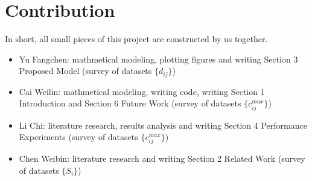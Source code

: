 \section{Contribution}

In short, all small pieces of this project are constructed by us together.
\begin{itemize}
    \item Yu Fangchen: mathmetical modeling, plotting figures and writing Section 3 Proposed Model (survey of datasets $\{d_{ij}\}$) 
    \item Cai Weilin: mathmetical modeling, writing code, writing Section 1 Introduction and Section 6 Future Work (survey of datasets $\{c_{ij}^{max}\}$) 
    \item Li Chi: literature research, results analysis and writing Section 4 Performance Experiments (survey of datasets $\{c_{ij}^{max}\}$) 
    \item Chen Weibin: literature research and writing Section 2 Related Work (survey of datasets $\{S_i\}$) 
\end{itemize}
